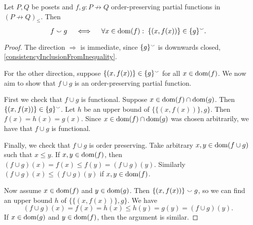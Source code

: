 \begin{lemma} \label{consistencyFromAtomsOrderPreservingPartialFunctions}
Let $P,Q$ be posets and $f,g: P\not\to Q$ order-preserving partial functions in $(P\not\to Q)_{\leq}$. Then
\[ f\smallsmile g \quad\iff\quad \forall x\in \operatorname{dom}(f): \; \{(x, f(x))\} \in \{g\}^\smallsmile. \]
\end{lemma}
\begin{proof}
The direction $\Rightarrow$ is immediate, since $\{g\}^\smallsmile$ is downwards closed, \ref{consistencyInclusionFromInequality}.

For the other direction, suppose $\{(x, f(x))\} \in \{g\}^\smallsmile$ for all $x\in \operatorname{dom}(f)$. We now aim to show that $f\cup g$ is an order-preserving partial function.

First we check that $f\cup g$ is functional. Suppose $x\in \operatorname{dom}(f)\cap \operatorname{dom}(g)$. Then $\{(x, f(x))\} \in \{g\}^\smallsmile$. Let $h$ be an upper bound of $\big\{\{(x, f(x))\}, g\big\}$. Then $f(x) = h(x) = g(x)$. Since $x\in \operatorname{dom}(f)\cap \operatorname{dom}(g)$ was chosen arbitrarily, we have that $f\cup g$ is functional.

Finally, we check that $f\cup g$ is order preserving. Take arbitrary $x,y\in \operatorname{dom}(f\cup g)$ such that $x\leq y$. If $x,y\in \operatorname{dom}(f)$, then $(f\cup g)(x) = f(x) \leq f(y) = (f\cup g)(y)$. Similarly $(f\cup g)(x) \leq (f\cup g)(y)$ if $x,y\in \operatorname{dom}(f)$.

Now assume $x\in \operatorname{dom}(f)$ and $y\in \operatorname{dom}(g)$. Then $\{(x,f(x))\} \smallsmile g$, so we can find an upper bound $h$ of $\big\{\{(x, f(x))\}, g\big\}$. We have
\[ (f\cup g)(x) = f(x) = h(x) \leq h(y) = g(y) = (f\cup g)(y). \]
If $x\in \operatorname{dom}(g)$ and $y\in \operatorname{dom}(f)$, then the argument is similar.
\end{proof}

